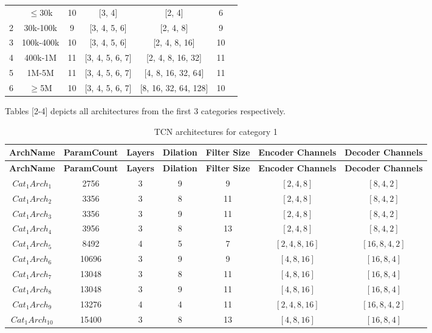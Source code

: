 \documentclass[preprint,12pt]{elsarticle}
\begin{document}
\begin{itemize}
\begin{footnotesize}
\begin{longtable}{ccccccc}
\endfoot

\bottomrule
\endlastfoot
1 & $\le$30k & 10 & [3, 4] & [2, 4] & 6 \\
2 & 30k-100k & 9 & [3, 4, 5, 6] & [2, 4, 8] & 9 \\
3 & 100k-400k & 10 & [3, 4, 5, 6] & [2, 4, 8, 16] & 10 \\
4 & 400k-1M & 11 & [3, 4, 5, 6, 7] & [2, 4, 8, 16, 32] & 11 \\
5 & 1M-5M & 11 & [3, 4, 5, 6, 7] & [4, 8, 16, 32, 64] & 11  \\
6 & $\ge$5M & 10 & [3, 4, 5, 6, 7] & [8, 16, 32, 64, 128] & 10 \\
\end{longtable}
\end{footnotesize}


Tables [2-4] depicts all architectures from the first 3 categories respectively. 


\begin{footnotesize}
\setlength{\tabcolsep}{6pt}
\begin{longtable}{ccccccc}
\caption{TCN architectures for category 1}
\label{tab:cat1}\\
\toprule
\textbf{ArchName} & \textbf{ParamCount} & \textbf{Layers} & \textbf{Dilation} & \textbf{Filter Size} & \textbf{Encoder Channels} & \textbf{Decoder Channels} \\
\midrule
\endfirsthead

\toprule
\textbf{ArchName} & \textbf{ParamCount} & \textbf{Layers} & \textbf{Dilation} & \textbf{Filter Size} & \textbf{Encoder Channels} & \textbf{Decoder Channels} \\
\midrule
\endhead

\endfoot

\bottomrule
\endlastfoot

$Cat_1Arch_1$ & 2756  & 3 & 9 & 9  & $[2,4,8]$        & $[8,4,2]$ \\
$Cat_1Arch_2$ & 3356  & 3 & 8 & 11 & $[2,4,8]$        & $[8,4,2]$ \\
$Cat_1Arch_3$ & 3356  & 3 & 9 & 11 & $[2,4,8]$        & $[8,4,2]$ \\
$Cat_1Arch_4$ & 3956  & 3 & 8 & 13 & $[2,4,8]$        & $[8,4,2]$ \\
$Cat_1Arch_5$ & 8492  & 4 & 5 & 7  & $[2,4,8,16]$     & $[16,8,4,2]$ \\
$Cat_1Arch_6$ & 10696 & 3 & 9 & 9  & $[4,8,16]$       & $[16,8,4]$ \\
$Cat_1Arch_7$ & 13048 & 3 & 8 & 11 & $[4,8,16]$       & $[16,8,4]$ \\
$Cat_1Arch_8$ & 13048 & 3 & 9 & 11 & $[4,8,16]$       & $[16,8,4]$ \\
$Cat_1Arch_9$ & 13276 & 4 & 4 & 11 & $[2,4,8,16]$     & $[16,8,4,2]$ \\
$Cat_1Arch_{10}$ & 15400 & 3 & 8 & 13 & $[4,8,16]$     & $[16,8,4]$ \\
\end{longtable}
\end{footnotesize}




\end{itemize}
\end{document}
